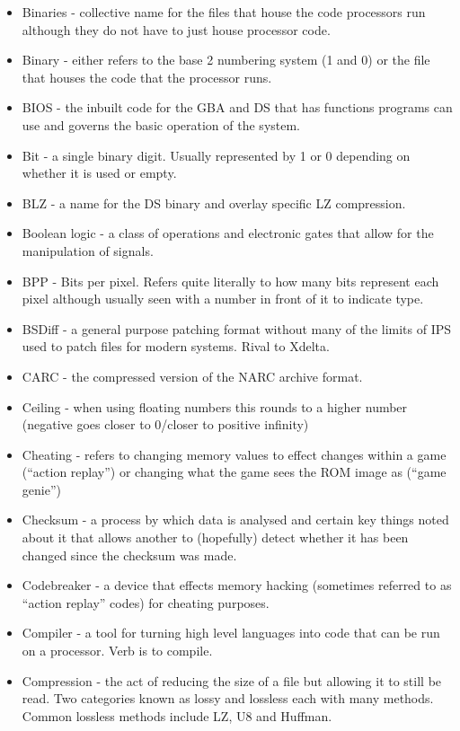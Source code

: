 \documentclass[
]{book}
\begin{document}
\begin{itemize}
\item
  Binaries - collective name for the files that house the code processors run although they do not have to just house processor code.
\item
  Binary - either refers to the base 2 numbering system (1 and 0) or the file that houses the code that the processor runs.
\item
  BIOS - the inbuilt code for the GBA and DS that has functions programs can use and governs the basic operation of the system.
\item
  Bit - a single binary digit. Usually represented by 1 or 0 depending on whether it is used or empty.
\item
  BLZ - a name for the DS binary and overlay specific LZ compression.
\item
  Boolean logic - a class of operations and electronic gates that allow for the manipulation of signals.
\item
  BPP - Bits per pixel. Refers quite literally to how many bits represent each pixel although usually seen with a number in front of it to indicate type.
\item
  BSDiff - a general purpose patching format without many of the limits of IPS used to patch files for modern systems. Rival to Xdelta.
\item
  CARC - the compressed version of the NARC archive format.
\item
  Ceiling - when using floating numbers this rounds to a higher number (negative goes closer to 0/closer to positive infinity)
\item
  Cheating - refers to changing memory values to effect changes within a game (``action replay'') or changing what the game sees the ROM image as (``game genie'')
\item
  Checksum - a process by which data is analysed and certain key things noted about it that allows another to (hopefully) detect whether it has been changed since the checksum was made.
\item
  Codebreaker - a device that effects memory hacking (sometimes referred to as ``action replay'' codes) for cheating purposes.
\item
  Compiler - a tool for turning high level languages into code that can be run on a processor. Verb is to compile.
\item
  Compression - the act of reducing the size of a file but allowing it to still be read. Two categories known as lossy and lossless each with many methods. Common lossless methods include LZ, U8 and Huffman.

\end{itemize}
\end{document}
